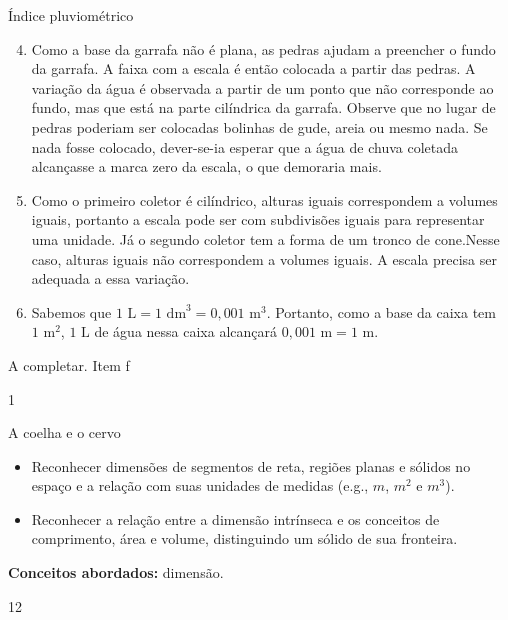 \begin{answer}{Índice pluviométrico}
{
\begin{enumerate}\setcounter{enumi}{3}
\item {} 
Como a base da garrafa não é plana, as pedras ajudam a preencher o fundo da garrafa. A faixa com a escala é então colocada a partir das pedras. A variação da água é observada a partir de um ponto que não corresponde ao fundo, mas que está na parte cilíndrica da garrafa. Observe que no lugar de pedras poderiam ser colocadas bolinhas de gude, areia ou mesmo nada. Se nada fosse colocado, dever-se-ia  esperar que a água de chuva coletada alcançasse a marca zero da escala, o que demoraria mais.

\item {} 
Como o primeiro coletor é cilíndrico, alturas iguais correspondem a volumes iguais, portanto a escala pode ser com subdivisões iguais para representar uma unidade. Já o segundo coletor tem a forma de um tronco de cone.Nesse caso, alturas iguais não correspondem a volumes iguais. A escala precisa ser adequada a essa variação.

\item {} 
Sabemos que \(1\text{ L} = 1\text{ dm}^3 = 0{,}001\text{ m}^3\). Portanto, como a base da caixa tem \(1\text{ m}^2\), \(1\text{ L}\) de água nessa caixa alcançará \(0{,}001\text{ m} = 1\text{ m}\).

\end{enumerate}

A completar. Item f
}{1}
\end{answer}
\clearmargin
\begin{objectives}{A coelha e o cervo}
{
\begin{itemize}
\item {} 
Reconhecer dimensões de segmentos de reta, regiões planas e sólidos no espaço e a relação com suas unidades de medidas (e.g., \(m\), \(m^2\) e \(m^3\)).

\item {} 
Reconhecer a relação entre a dimensão intrínseca e os conceitos de comprimento, área e volume, distinguindo um sólido de sua fronteira.

\end{itemize}

\textbf{Conceitos abordados:} dimensão.
}{1}{2}
\end{objectives}
